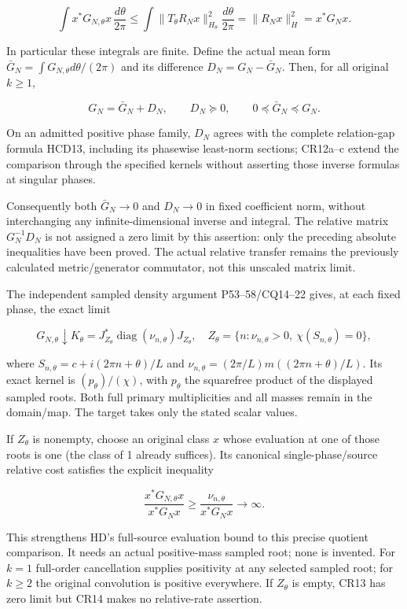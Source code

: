 \[
\int x^*G_{N,\theta}x\,\frac{d\theta}{2\pi}
\le\int\|T_\theta R_Nx\|_{H_\theta}^2\frac{d\theta}{2\pi}
=\|R_Nx\|_H^2=x^*G_Nx.
\tag{CR12c}
\]

In particular these integrals are finite. Define the actual mean form \(\bar G_N=\int G_{N,\theta}d\theta/(2\pi)\) and its difference \(D_N=G_N-\bar G_N\). Then, for all original \(k\ge1\),

\[
G_N=\bar G_N+D_N,\qquad D_N\succeq0,
\qquad 0\preceq\bar G_N\preceq G_N.
\tag{CR12}
\]

On an admitted positive phase family, \(D_N\) agrees with the complete relation-gap formula HCD13, including its phasewise least-norm sections; CR12a--c extend the comparison through the specified kernels without asserting those inverse formulas at singular phases.

Consequently both \(\bar G_N\to0\) and \(D_N\to0\) in fixed coefficient norm, without interchanging any infinite-dimensional inverse and integral. The relative matrix \(G_N^{-1}D_N\) is not assigned a zero limit by this assertion: only the preceding absolute inequalities have been proved. The actual relative transfer remains the previously calculated metric/generator commutator, not this unscaled matrix limit.

The independent sampled density argument P53--58/CQ14--22 gives, at each fixed phase, the exact limit

\[
G_{N,\theta}\downarrow K_\theta
=J_{Z_\theta}^*\operatorname{diag}(\nu_{n,\theta})J_{Z_\theta},
\quad Z_\theta=\{n:\nu_{n,\theta}>0,\ \chi(S_{n,\theta})=0\},
\tag{CR13}
\]

where \(S_{n,\theta}=c+i(2\pi n+\theta)/L\) and \(\nu_{n,\theta}=(2\pi/L)m((2\pi n+\theta)/L)\). Its exact kernel is \((p_\theta)/(\chi)\), with \(p_\theta\) the squarefree product of the displayed sampled roots. Both full primary multiplicities and all masses remain in the domain/map. The target takes only the stated scalar values.

If \(Z_\theta\) is nonempty, choose an original class \(x\) whose evaluation at one of those roots is one (the class of 1 already suffices). Its canonical single-phase/source relative cost satisfies the explicit inequality

\[
\frac{x^*G_{N,\theta}x}{x^*G_Nx}
\ge\frac{\nu_{n,\theta}}{x^*G_Nx}\longrightarrow\infty.
\tag{CR14}
\]

This strengthens HD's full-source evaluation bound to this precise quotient comparison. It needs an actual positive-mass sampled root; none is invented. For \(k=1\) full-order cancellation supplies positivity at any selected sampled root; for \(k\ge2\) the original convolution is positive everywhere. If \(Z_\theta\) is empty, CR13 has zero limit but CR14 makes no relative-rate assertion.

